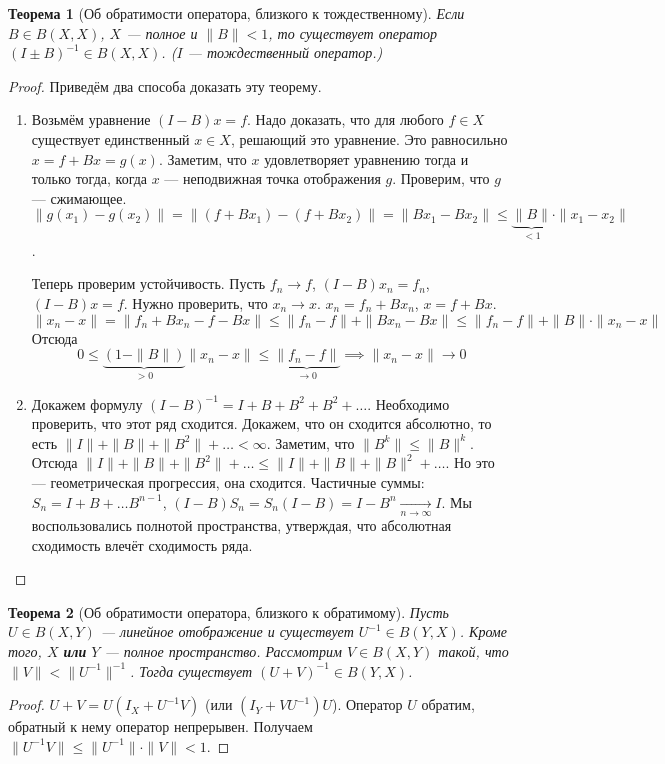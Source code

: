 \documentclass[11pt,openany,a4paper]{scrartcl}
\theoremstyle{plain}
\newtheorem{theorem}{Теорема}[subsection]
\theoremstyle{definition}
\newcommand{\underto}[1]{\xrightarrow[#1]{}}
\begin{document}
\begin{theorem}[Об обратимости оператора, близкого к тождественному]
    Если $B \in B(X, X)$, $X$ — полное и  $\|B\| < 1$, то существует оператор
    $(I \pm B)^{-1} \in B(X, X)$. ($I$ — тождественный оператор.)
\end{theorem}
\begin{proof}
    Приведём два способа доказать эту теорему.
    \begin{enumerate}
        \item Возьмём уравнение $(I-B)x = f$. Надо доказать, что для любого
        $f \in X$ существует единственный $x \in X$, решающий это уравнение.
        Это равносильно $x = f + Bx = g(x)$. Заметим, что $x$ удовлетворяет
        уравнению тогда и только тогда, когда $x$ — неподвижная точка отображения
        $g$. Проверим, что $g$ — сжимающее.
        $\|g(x_1) - g(x_2)\| = \|(f + Bx_1) - (f + Bx_2)\| =
        \|Bx_1 - Bx_2\| \leqslant \underbrace{\|B\|}_{< 1} \cdot \|x_1 - x_2\|$.
        
        Теперь проверим устойчивость. Пусть $f_n \to f$, $(I-B)x_n = f_n$,
        $(I-B)x=f$. Нужно проверить, что $x_n \to x$. $x_n = f_n + Bx_n$,
        $x = f + Bx$.
        $$
        \|x_n - x\| = \|f_n + Bx_n - f - Bx\| \leqslant \|f_n - f\| +
        \|Bx_n - Bx\| \leqslant \|f_n - f\| + \|B\|\cdot \|x_n - x\|
        $$
        Отсюда
        $$
        0 \leqslant \underbrace{(1 - \|B\|)}_{>0}\|x_n - x\|\leqslant
        \underbrace{\|f_n - f\|}_{\to 0} \implies
        \|x_n - x\| \to 0
        $$
        \item Докажем формулу $(I - B)^{-1} = I + B + B^2 + B^2 + \ldots$.
        Необходимо проверить, что этот ряд сходится. Докажем, что он
        сходится абсолютно, то есть $\|I\| + \|B\| + \|B^2\| + \ldots < \infty$.
        Заметим, что $\|B^k\| \leqslant \|B\|^k$. Отсюда
        $\|I\| + \|B\| + \|B^2\| + \ldots \leqslant
        \|I\| + \|B\| + \|B\|^2 + \ldots$. Но это — геометрическая прогрессия,
        она сходится.
        Частичные суммы: $S_n = I + B + \ldots B^{n-1}$,
        $(I - B)S_n = S_n(I-B) = I - B^n \underto{n \to \infty} I$.
        Мы воспользовались полнотой пространства, утверждая, что абсолютная
        сходимость влечёт сходимость ряда.
    \end{enumerate}
\end{proof}

\begin{theorem}[Об обратимости оператора, близкого к обратимому]
    Пусть $U \in B(X, Y)$ — линейное отображение и существует $U^{-1}\in B(Y, X)$.
    Кроме того, $X$ \textbf{или} $Y$ — полное пространство.
    Рассмотрим $V\in B(X, Y)$ такой, что $\|V\| < \|U^{-1}\|^{-1}$. Тогда
    существует $(U + V)^{-1} \in B(Y, X)$.
\end{theorem}
\begin{proof}
    $U + V = U(I_X + U^{-1}V)$ (или $(I_Y + VU^{-1})U$).
    Оператор $U$ обратим, обратный к нему оператор
    непрерывен. Получаем $\|U^{-1}V\|\leqslant\|U^{-1}\|\cdot\|V\| < 1$.
\end{proof}
\end{document}
